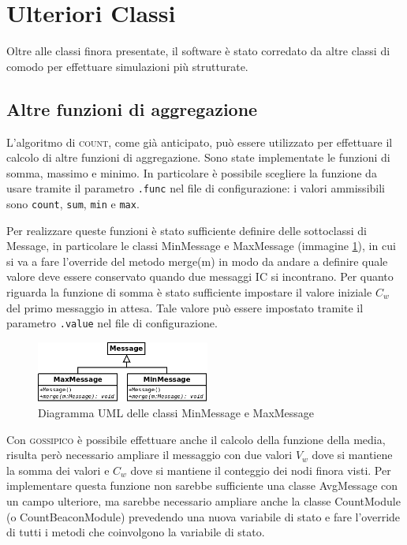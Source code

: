 \documentclass[a4paper,12pt]{article}
\begin{document}
\section{Ulteriori Classi}
\label{sec:ulteriori}

Oltre alle classi finora presentate, il software \`e stato corredato da altre classi di comodo per effettuare simulazioni pi\`u strutturate.

\subsection{Altre funzioni di aggregazione}

L'algoritmo di \textsc{count}, come gi\`a anticipato, pu\`o essere utilizzato per effettuare il calcolo di altre funzioni di aggregazione. Sono state implementate le funzioni di somma, massimo e minimo. In particolare \`e possibile scegliere la funzione da usare tramite il parametro \texttt{.func} nel file di configurazione: i valori ammissibili sono \texttt{count}, \texttt{sum}, \texttt{min} e \texttt{max}.

Per realizzare queste funzioni \`e stato sufficiente definire delle sottoclassi di \textsf{Message}, in particolare le classi \textsf{MinMessage} e \textsf{MaxMessage} (immagine \ref{img:func}), in cui si va a fare l'override del metodo \textsf{merge(m)} in modo da andare a definire quale valore deve essere conservato quando due messaggi IC si incontrano. Per quanto riguarda la funzione di somma \`e stato sufficiente impostare il valore iniziale $C_w$ del primo messaggio in attesa. Tale valore pu\`o essere impostato tramite il parametro \texttt{.value} nel file di configurazione.

\begin{figure}[ht]
\centering
\includegraphics[height=2cm]{message_func.png}
\caption{Diagramma UML delle classi \textsf{MinMessage} e \textsf{MaxMessage}}
\label{img:func}
\end{figure}

Con \textsc{gossipico} \`e possibile effettuare anche il calcolo della funzione della media, risulta per\`o necessario ampliare il messaggio con due valori $V_w$ dove si mantiene la somma dei valori e $C_w$ dove si mantiene il conteggio dei nodi finora visti. Per implementare questa funzione non sarebbe sufficiente una classe \textsf{AvgMessage} con un campo ulteriore, ma sarebbe necessario ampliare anche la classe \textsf{CountModule} (o \textsf{CountBeaconModule}) prevedendo una nuova variabile di stato e fare l'override di tutti i metodi che coinvolgono la variabile di stato.
\end{document}
